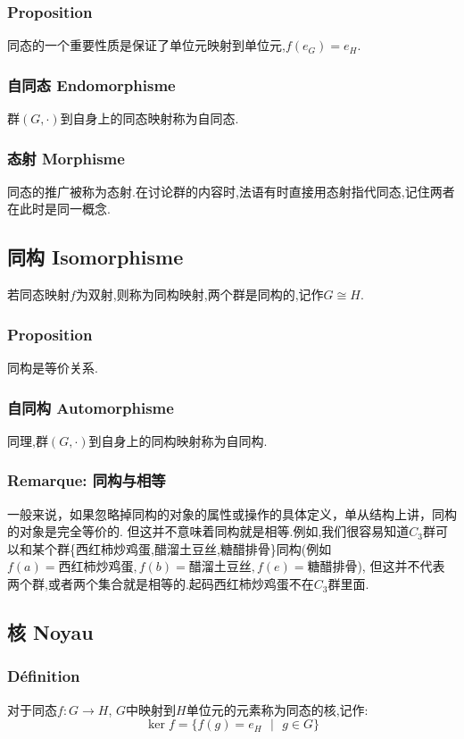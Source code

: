 \documentclass[12pt, a4paper, oneside]{ctexbook}
\begin{document}
  \subsubsection{Proposition}
  同态的一个重要性质是保证了单位元映射到单位元,$f(e_G)=e_H$.
  \subsubsection{自同态 Endomorphisme}
  群$(G,\cdot)$到自身上的同态映射称为自同态.
  \subsubsection{态射 Morphisme}
  同态的推广被称为态射.在讨论群的内容时,法语有时直接用态射指代同态,记住两者在此时是同一概念.
  \subsection{同构 Isomorphisme}    \label{myref:Isomorphisme}
  若同态映射$f$为双射,则称为同构映射,两个群是同构的,记作$G\cong H$.
  \subsubsection{Proposition}
  同构是等价关系.

  \subsubsection{自同构 Automorphisme}
  同理,群$(G,\cdot)$到自身上的同构映射称为自同构.
  \subsubsection{Remarque: 同构与相等}
  一般来说，如果忽略掉同构的对象的属性或操作的具体定义，单从结构上讲，同构的对象是完全等价的.
  但这并不意味着同构就是相等.例如,我们很容易知道$C_3$群可以和某个群\{西红柿炒鸡蛋,醋溜土豆丝,糖醋排骨\}同构(例如
  $f(a)=\text{西红柿炒鸡蛋},f(b)=\text{醋溜土豆丝},f(e)=\text{糖醋排骨}$),
  但这并不代表两个群,或者两个集合就是相等的.起码西红柿炒鸡蛋不在$C_3$群里面.

  \subsection{核 Noyau}
  \subsubsection{Définition}
  对于同态$f:G\rightarrow H $, $G$中映射到$H$单位元的元素称为同态的核,记作:
  $$
  \ker f=\{f(g)=e_H\text{ }|\text{ }g\in G  \}
  $$
\end{document}
